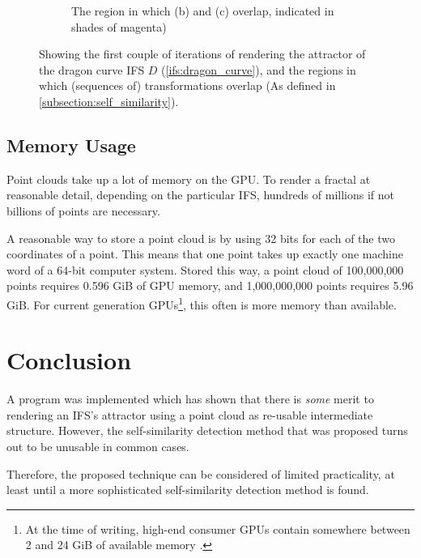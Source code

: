 \documentclass[11pt]{article}
\begin{document}
\begin{enumerate}
\begin{figure}
\begin{subfigure}[b]{0.4\textwidth}
         \caption{The region in which (b) and (c) overlap, indicated in shades of magenta)}
         \label{figure:dragon_curve_d}
     \end{subfigure}
        \caption{Showing the first couple of iterations of rendering the attractor of the dragon curve IFS $D$ (\autoref{ifs:dragon_curve}), and the regions in which (sequences of) transformations overlap (As defined in \autoref{subsection:self_similarity}).}
        \label{figure:dragon_curve_overlaps}
\end{figure}

\end{enumerate}

\subsection{Memory Usage}
\label{sec:org4d0e382}

Point clouds take up a lot of memory on the GPU. To render a fractal at reasonable detail, depending on the particular IFS,
hundreds of millions if not billions of points are necessary.

A reasonable way to store a point cloud is by using 32 bits for each of the two coordinates of a point. 
This means that one point takes up exactly one machine word of a 64-bit computer system.
Stored this way, a point cloud of 100,000,000 points requires 0.596 GiB of GPU memory,
and 1,000,000,000 points requires 5.96 GiB.
For current generation GPUs\footnote{At the time of writing, high-end consumer GPUs contain somewhere between 2 and 24 GiB of available memory \cite{ign2020topgpus}.}, this often is more memory than available.


\section{Conclusion}
\label{sec:orgcce44a9}
\label{section:conclusion}

A program was implemented which has shown that there is \emph{some} merit to rendering an IFS's attractor using a point cloud as re-usable intermediate structure.
However, the self-similarity detection method that was proposed turns out to be unusable in common cases.

Therefore, the proposed technique can be considered of limited practicality, 
at least until a more sophisticated self-similarity detection method is found.
\end{document}
